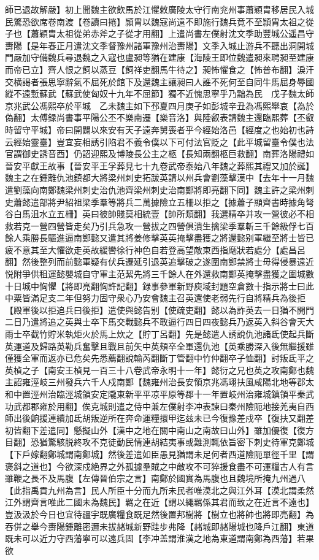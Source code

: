 師已退故解嚴】初上聞魏主欲飲馬於江懼敕廣陵太守行南兖州事蕭穎胄移居民入城民驚恐欲席卷南渡【卷讀曰捲】頴胄以魏寇尚遠不即施行魏兵竟不至頴胄太祖之從子也【蕭穎胄太祖從弟赤斧之子從才用翻】上遣尚書左僕射沈文季助豐城公遥昌守夀陽【是年春正月遣沈文季督豫州諸軍豫州治夀陽】文季入城止游兵不聽出洞開城門嚴加守備魏兵尋退魏之入寇也盧昶等猶在建康【海陵王即位魏遣昶來聘昶至建康而帝已立】齊人恨之飼以蒸豆【飼祥吏翻馬牛待之】昶怖懼食之【怖普布翻】淚汗交横謁者張思寧辭氣不屈死於館下及還魏主讓昶曰人誰不死何至自同牛馬屈身辱國縱不遠慙蘇武【蘇武使匈奴十九年不屈節】獨不近愧思寧乎乃黜為民　戊子魏太師京兆武公馮熙卒於平城　乙未魏主如下邳夏四月庚子如彭城辛丑為馮熙舉哀【為於偽翻】太傅録尚書事平陽公丕不樂南遷【樂音洛】與陸叡表請魏主還臨熙葬【丕叡時留守平城】帝曰開闢以來安有天子遠奔舅喪者乎今經始洛邑【經度之也始初也詩云經始靈臺】豈宜妄相誘引陷君不義令僕以下可付法官貶之【此平城留臺令僕也法官謂御史誘音酉】仍詔迎熙及博陵長公主之柩【長知兩翻柩巨救翻】南葬洛陽禮如晉安平獻王故事【晉安平王孚葬見七十九卷武帝泰始八年魏之葬熙其禮又加於誕】　魏主之在鍾離仇池鎮都大將梁州刺史拓跋英請以州兵會劉藻擊漢中【去年十一月魏遣劉藻向南鄭魏梁州刺史治仇池齊梁州刺史治南鄭將即亮翻下同】魏主許之梁州刺史蕭懿遣部將尹紹祖梁季羣等將兵二萬據險立五柵以拒之【據蕭子顯齊書時據角弩谷白馬沮水立五柵】英曰彼帥賤莫相統壹【帥所類翻】我選精卒并攻一營彼必不相救若克一營四營皆走矣乃引兵急攻一營拔之四營俱潰生擒梁季羣斬三千餘級俘七百餘人乘勝長驅進逼南鄭懿又遣其將姜修擊英英掩擊盡獲之將還懿别軍繼至將士皆已疲不意其至大懼欲走英故緩轡徐行神色自若登高望敵東西指麾狀若處分【處昌呂翻】然後整列而前懿軍疑有伏兵遷延引退英追擊破之遂圍南鄭禁將士毋得侵暴遠近悦附爭供租運懿嬰城自守軍主范絜先將三千餘人在外還救南鄭英掩擊盡獲之圍城數十日城中恟懼【將即亮翻恟許記翻】録事參軍新野庾域封題空倉數十指示將士曰此中粟皆滿足支二年但努力固守衆心乃安會魏主召英還使老弱先行自將精兵為後拒【殿軍後以拒追兵曰後拒】遣使與懿告别【使疏吏翻】懿以為詐英去一日猶不開門二日乃遣將追之英與士卒下馬交戰懿兵不敢逼行四日四夜懿兵乃返英入斜谷會天大雨士卒截竹貯米執炬火於馬上炊之【貯丁呂翻】先是懿遣人誘說仇池諸氐使起兵斷英運道及歸路英勒兵奮擊且戰且前矢中英頰卒全軍還仇池【英乘勝深入後無繼援雖僅獲全軍而返亦已危矣先悉薦翻說輸芮翻斷丁管翻中竹仲翻卒子恤翻】討叛氐平之英楨之子【南安王楨見一百三十八卷武帝永明十一年】懿衍之兄也英之攻南鄭也魏主詔雍涇岐三州發兵六千人戍南鄭【魏雍州治長安領京兆馮翊扶風咸陽北地等郡太和中置涇州治臨涇城領安定隴東新平平凉平原等郡十一年置岐州治雍城鎮領平秦武功武都郡雍於用翻】俟克城則遣之侍中兼左僕射李冲表諫曰秦州險阨地接羌夷自西師出後餉援連續加氐胡叛逆所在奔命運糧擐甲迄兹未已今復豫差戍卒【復扶又翻差初皆翻下差遣同】懸擬山外【漢中之地在關中南山之南故曰山外】雖加優復【復方目翻】恐猶驚駭脱終攻不克徒動民情連胡結夷事或難測輒依旨密下刺史待軍克鄭城【下戶嫁翻鄭城謂南鄭城】然後差遣如臣愚見猶謂未足何者西道險阨單徑千里【謂褒斜之道也】今欲深戍絶界之外孤據羣賊之中敵攻不可猝援食盡不可運糧古人有言雖鞭之長不及馬腹【左傳晉伯宗之言】南鄭於國實為馬腹也且魏境所掩九州過八【此指禹貢九州為言】民人所臣十分而九所未民者唯漠北之與江外耳【漠北謂柔然江外謂齊言唯此二國未為魏民】羈之在近【謂以繩羈係其君而致之在近言不遠也】豈汲汲於今日也宜待疆宇既廣糧食既足然後置邦樹將【樹立也將帥也將即亮翻】為吞併之舉今夀陽鍾離密邇未拔赭城新野跬步弗降【赭城即赭陽城也降戶江翻】東道既未可以近力守西藩寧可以遠兵固【李冲盖謂淮漢之地為東道謂南鄭為西藩】若果欲